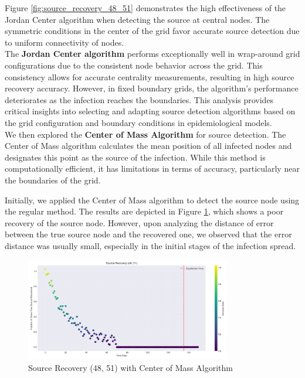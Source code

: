 Figure \ref{fig:source_recovery_48_51} demonstrates the high effectiveness of the Jordan Center algorithm when detecting the source at central nodes. The symmetric conditions in the center of the grid favor accurate source detection due to uniform connectivity of nodes.\\

The \textbf{Jordan Center algorithm} performs exceptionally well in wrap-around grid configurations due to the consistent node behavior across the grid. This consistency allows for accurate centrality measurements, resulting in high source recovery accuracy. However, in fixed boundary grids, the algorithm's performance deteriorates as the infection reaches the boundaries. This analysis provides critical insights into selecting and adapting source detection algorithms based on the grid configuration and boundary conditions in epidemiological models.\\

We then explored the \textbf{Center of Mass Algorithm} for source detection. The Center of Mass algorithm calculates the mean position of all infected nodes and designates this point as the source of the infection. While this method is computationally efficient, it has limitations in terms of accuracy, particularly near the boundaries of the grid.

Initially, we applied the Center of Mass algorithm to detect the source node using the regular method. The results are depicted in Figure \ref{fig:source_recovery_48_51_Center_of_Mass}, which shows a poor recovery of the source node. However, upon analyzing the distance of error between the true source node and the recovered one, we observed that the error distance was usually small, especially in the initial stages of the infection spread.

\begin{figure}[H]
    \centering
    \includegraphics[width=0.8\textwidth]{source_recovery_48_51_Center_of_Mass.png}
    \caption{Source Recovery (48, 51) with Center of Mass Algorithm}
    \label{fig:source_recovery_48_51_Center_of_Mass}
\end{figure}


